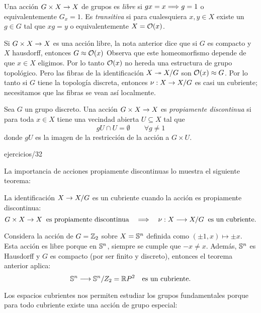 \documentclass[../../topologia_algebraica]{subfiles}
\begin{document}
\begin{defin}
  Una acci\'on $G\times X\rightarrow X$ de grupos es \emph{libre} si $gx=x \Longrightarrow g=1$ o equivalentemente
  $G_x=1$. Es \emph{transitiva} si para cualesquiera $x,y\in X$ existe un $g\in G$ tal que
  $xg=y$ o equivalentemente $X=\mathcal{O}(x)$.
\end{defin}

Si $G\times X\rightarrow X$ es una acci\'on libre, la nota anterior dice que si $G$ es compacto y
$X$ hausdorff, entonces $G\approx\mathcal{O}(x)$ Observa que este homeomorfismo depende de que $x\in X$
eligimos. Por lo tanto $\mathcal{O}(x)$ no hereda una estructura de grupo topol\'ogico. Pero las fibras
de la identificaci\'on $X\twoheadrightarrow X/G$ son $\mathcal{O}(x)\approx G$. Por lo tanto si $G$ tiene la topolog\'ia
discreta, entonces $\nu:X\rightarrow X/G$ es casi un cubriente; necesitamos que las fibras se vean as\'i
localmente.

\begin{defin}
  Sea $G$ un grupo discreto. Una acci\'on $G\times X\rightarrow X$ es \emph{propiamente discontinua}
  si para toda $x\in X$ tiene una vecindad abierta $U\subseteq X$ tal que
  \[
    gU \cap U = \emptyset \qquad \forall g\neq 1
  \]
  donde $gU$ es la imagen de la restricci\'on de la acci\'on a $G\times U$.
\end{defin}

{ejercicios/32}%

La importancia de acciones propiamente discontinuas lo muestra el siguiente teorema:

\begin{thm}
  La identificaci\'on $X\rightarrow X/G$ es un cubriente cuando la acci\'on es propiamente discontinua:
  \[
    G\times X\rightarrow X\;\;\text{es propiamente discontinua} \quad\Longrightarrow\quad
    \nu:X\longrightarrow X/G \;\;\text{es un cubriente}.
  \]
\end{thm}

\begin{ejemplo}\label{ej:z2_actua_sobre_sn}
  Considera la acci\'on de $G=\mathbb{Z}_2$ sobre $X=\mathbb{S}^n$ definida como $(\pm 1,x)\mapsto \pm x$.
  Esta acci\'on es libre porque en $\mathbb{S}^n$, siempre se cumple que $-x\neq x$. Adem\'as, $\mathbb{S}^n$
  es Hausdorff y $G$ es compacto (por ser finito y discreto), entonces el teorema anterior aplica:
  \[
    \mathbb{S}^n \longrightarrow \mathbb{S}^n/Z_2 = \mathbb{R} P^2 \quad\text{es un cubriente}.
  \]
\end{ejemplo}

Los espacios cubrientes nos permiten estudiar los grupos fundamentales porque para todo cubriente
existe una acci\'on de grupo especial:
\end{document}
